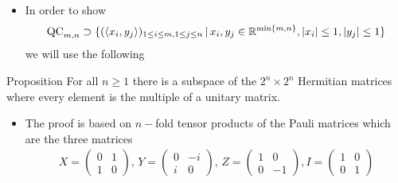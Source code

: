 \begin{frame}
	\begin{itemize}
		\item  In order to show 
		\begin{align*} \textup{QC}_{m,n} \supset \{ (\langle x_i,y_j \rangle)_{1 \le i \le m, 1 \le j \le n} \,| \, x_i,y_j \in 				\mathbb{R}^{ \min \{m,n \} }, \vert x_i  \vert \le 1, \vert y_j \vert \le 1  \} 
		\end{align*}  we will use the following 
	\end{itemize}
	\pause
	\begin{block}{Proposition}
		For all $ n \ge 1 $ there is a subspace of the $ 2^n \times 2^n $ Hermitian matrices where every element is the multiple of a unitary matrix. 
	\end{block}
	\pause
	\begin{itemize}
		\item The proof is based on $ n- $fold tensor products of the Pauli matrices which are the three matrices 
		\begin{align*}
		X = \begin{pmatrix}
		0 & 1 \\ 1 & 0
		\end{pmatrix}, \, Y = \begin{pmatrix}
		0 & -i \\ i & 0
		\end{pmatrix}, \, Z = \begin{pmatrix}
		1 & 0 \\ 0 & -1
		\end{pmatrix}, I = \begin{pmatrix}
		1 & 0 \\ 0 & 1
		\end{pmatrix}
		\end{align*}
	\end{itemize}
\end{frame}
